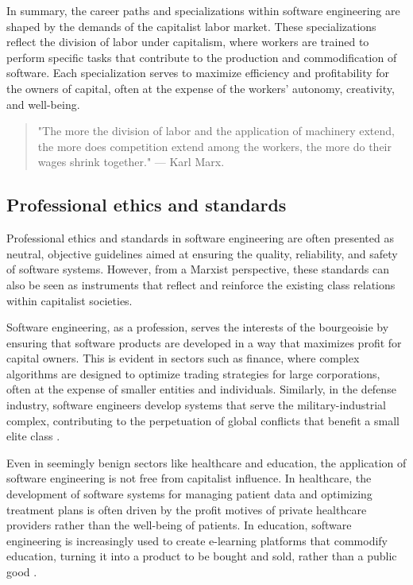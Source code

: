 \begin{refsection}
\begin{multicols}{2}
{In summary, the career paths and specializations within software engineering are shaped by the demands of the capitalist labor market. These specializations reflect the division of labor under capitalism, where workers are trained to perform specific tasks that contribute to the production and commodification of software. Each specialization serves to maximize efficiency and profitability for the owners of capital, often at the expense of the workers' autonomy, creativity, and well-being.

\begin{quote}
"The more the division of labor and the application of machinery extend, the more does competition extend among the workers, the more do their wages shrink together." — Karl Marx\cite{marx1867}.
\end{quote}
}
\subsection{Professional ethics and standards}
{\small
Professional ethics and standards in software engineering are often presented as neutral, objective guidelines aimed at ensuring the quality, reliability, and safety of software systems. However, from a Marxist perspective, these standards can also be seen as instruments that reflect and reinforce the existing class relations within capitalist societies.

Software engineering, as a profession, serves the interests of the bourgeoisie by ensuring that software products are developed in a way that maximizes profit for capital owners. This is evident in sectors such as finance, where complex algorithms are designed to optimize trading strategies for large corporations, often at the expense of smaller entities and individuals. Similarly, in the defense industry, software engineers develop systems that serve the military-industrial complex, contributing to the perpetuation of global conflicts that benefit a small elite class \cite{fuchs2016digital}. 

Even in seemingly benign sectors like healthcare and education, the application of software engineering is not free from capitalist influence. In healthcare, the development of software systems for managing patient data and optimizing treatment plans is often driven by the profit motives of private healthcare providers rather than the well-being of patients. In education, software engineering is increasingly used to create e-learning platforms that commodify education, turning it into a product to be bought and sold, rather than a public good \cite{noble2018algorithms}.

}
\end{multicols}
\end{refsection}
